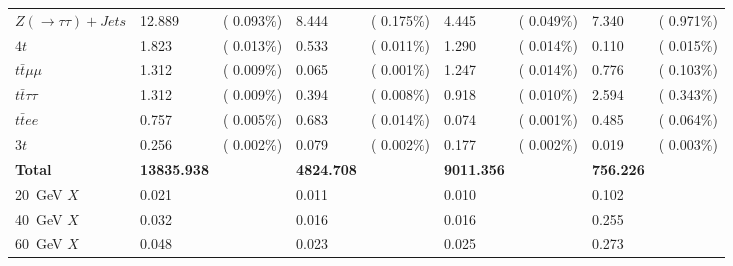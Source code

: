 \begin{tabular}{L{35mm} R{15mm}R{15mm} R{15mm}R{15mm} R{15mm}R{15mm} R{15mm}R{15mm}}
$Z(\to \tau\tau) + Jets$ & 12.889               & (  0.093\%)   & 8.444             & (  0.175\%)       & 4.445             & (  0.049\%)       & 7.340             & (  0.971\%)   \\
$4t$                     & 1.823                & (  0.013\%)   & 0.533             & (  0.011\%)       & 1.290             & (  0.014\%)       & 0.110             & (  0.015\%)   \\
$t\bar{t}\mu\mu$         & 1.312                & (  0.009\%)   & 0.065             & (  0.001\%)       & 1.247             & (  0.014\%)       & 0.776             & (  0.103\%)   \\
$t\bar{t}\tau\tau$       & 1.312                & (  0.009\%)   & 0.394             & (  0.008\%)       & 0.918             & (  0.010\%)       & 2.594             & (  0.343\%)   \\
$t\bar{t}ee$             & 0.757                & (  0.005\%)   & 0.683             & (  0.014\%)       & 0.074             & (  0.001\%)       & 0.485             & (  0.064\%)   \\
$3t$                     & 0.256                & (  0.002\%)   & 0.079             & (  0.002\%)       & 0.177             & (  0.002\%)       & 0.019             & (  0.003\%)   \\
\textbf{Total}           & \textbf{13835.938}   &               & \textbf{4824.708} &                   & \textbf{9011.356} &                   & \textbf{756.226}  &               \\
\midrule
\SI{20}{\GeV} $X$        & 0.021                &               & 0.011             &                   & 0.010             &                   & 0.102             &               \\
\SI{40}{\GeV} $X$        & 0.032                &               & 0.016             &                   & 0.016             &                   & 0.255             &               \\
\SI{60}{\GeV} $X$        & 0.048                &               & 0.023             &                   & 0.025             &                   & 0.273             &               \\
\bottomrule
\end{tabular}